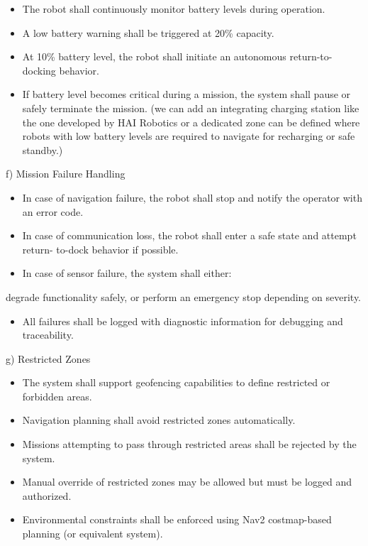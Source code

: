 \begin{itemize}
    \item The robot shall continuously monitor battery levels during operation.
    \item A low battery warning shall be triggered at 20\% capacity.
    \item At 10\% battery level, the robot shall initiate an autonomous return-to-docking
behavior.

    \item If battery level becomes critical during a mission, the system shall pause or safely
terminate the mission. (we can add an integrating charging station like the one developed by HAI Robotics or a dedicated zone can be defined where robots with low battery levels are required to navigate for recharging or safe standby.)

\end{itemize}

f)    Mission Failure Handling

\begin{itemize}
    \item In case of navigation failure, the robot shall stop and notify the operator with an
error code.

    \item In case of communication loss, the robot shall enter a safe state and attempt return-
to-dock behavior if possible.

    \item In case of sensor failure, the system shall either:
\end{itemize}

degrade functionality safely, or perform an emergency stop depending on severity.

\begin{itemize}
    \item All failures shall be logged with diagnostic information for debugging and
traceability.

\end{itemize}

g) Restricted Zones

\begin{itemize}
    \item The system shall support geofencing capabilities to define restricted or forbidden
areas.

    \item Navigation planning shall avoid restricted zones automatically.
    \item Missions attempting to pass through restricted areas shall be rejected by the system.
    \item Manual override of restricted zones may be allowed but must be logged and
authorized.

    \item Environmental constraints shall be enforced using Nav2 costmap-based planning (or
equivalent system).

\end{itemize}

